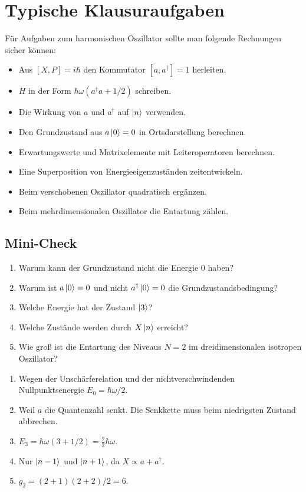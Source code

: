 \section{Typische Klausuraufgaben}

\begin{examtipbox}
Für Aufgaben zum harmonischen Oszillator sollte man folgende Rechnungen sicher können:
\begin{itemize}
    \item Aus $[X,P]=i\hbar$ den Kommutator $[a,a^\dagger]=1$ herleiten.
    \item $H$ in der Form $\hbar\omega(a^\dagger a+1/2)$ schreiben.
    \item Die Wirkung von $a$ und $a^\dagger$ auf $\left|n\right\rangle$ verwenden.
    \item Den Grundzustand aus $a\left|0\right\rangle=0$ in Ortsdarstellung berechnen.
    \item Erwartungswerte und Matrixelemente mit Leiteroperatoren berechnen.
    \item Eine Superposition von Energieeigenzuständen zeitentwickeln.
    \item Beim verschobenen Oszillator quadratisch ergänzen.
    \item Beim mehrdimensionalen Oszillator die Entartung zählen.
\end{itemize}
\end{examtipbox}

\subsection*{Mini-Check}

\begin{enumerate}
    \item Warum kann der Grundzustand nicht die Energie $0$ haben?
    \item Warum ist $a\left|0\right\rangle=0$ und nicht $a^\dagger\left|0\right\rangle=0$ die Grundzustandsbedingung?
    \item Welche Energie hat der Zustand $\left|3\right\rangle$?
    \item Welche Zustände werden durch $X\left|n\right\rangle$ erreicht?
    \item Wie groß ist die Entartung des Niveaus $N=2$ im dreidimensionalen isotropen Oszillator?
\end{enumerate}

\begin{answerbox}
\begin{enumerate}
    \item Wegen der Unschärferelation und der nichtverschwindenden Nullpunktsenergie $E_0=\hbar\omega/2$.
    \item Weil $a$ die Quantenzahl senkt. Die Senkkette muss beim niedrigsten Zustand abbrechen.
    \item $E_3=\hbar\omega(3+1/2)=\frac72\hbar\omega$.
    \item Nur $\left|n-1\right\rangle$ und $\left|n+1\right\rangle$, da $X\propto a+a^\dagger$.
    \item $g_2=(2+1)(2+2)/2=6$.
\end{enumerate}
\end{answerbox}
